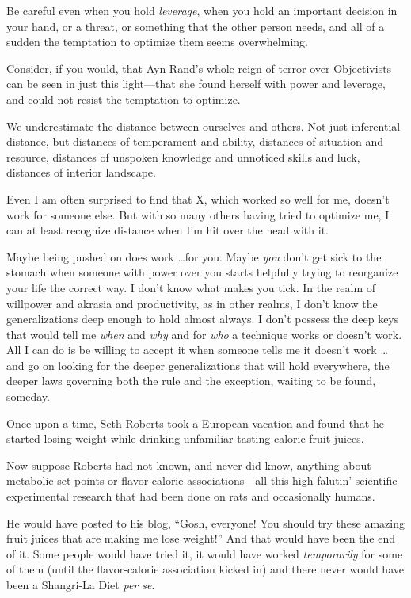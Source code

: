 {
 Be careful even when you hold \textit{leverage}, when you hold an
important decision in your hand, or a threat, or something that the
other person needs, and all of a sudden the temptation to optimize them
seems overwhelming.}

{
 Consider, if you would, that Ayn Rand's whole
reign of terror over Objectivists can be seen in just this light---that
she found herself with power and leverage, and could not resist the
temptation to optimize.}

{
 We underestimate the distance between ourselves and others. Not
just inferential distance, but distances of temperament and ability,
distances of situation and resource, distances of unspoken knowledge
and unnoticed skills and luck, distances of interior landscape.}

{
 Even I am often surprised to find that X, which worked so well for
me, doesn't work for someone else. But with so many
others having tried to optimize me, I can at least recognize distance
when I'm hit over the head with it.}

{
 Maybe being pushed on does work \ldots for you. Maybe \textit{you}
don't get sick to the stomach when someone with power
over you starts helpfully trying to reorganize your life the correct
way. I don't know what makes you tick. In the realm of
willpower and akrasia and productivity, as in other realms, I
don't know the generalizations deep enough to hold
almost always. I don't possess the deep keys that would
tell me \textit{when} and \textit{why} and for \textit{who} a technique
works or doesn't work. All I can do is be willing to
accept it when someone tells me it doesn't work \ldots
and go on looking for the deeper generalizations that will hold
everywhere, the deeper laws governing both the rule and the exception,
waiting to be found, someday.}

\myendsectiontext


{
 Once upon a time, Seth Roberts took a European vacation and found
that he started losing weight while drinking unfamiliar-tasting caloric
fruit juices. }

{
 Now suppose Roberts had not known, and never did know, anything
about metabolic set points or flavor-calorie associations---all this
high-falutin' scientific experimental research that had
been done on rats and occasionally humans.}

{
 He would have posted to his blog, ``Gosh,
everyone! You should try these amazing fruit juices that are making me
lose weight!'' And that would have been the end of
it. Some people would have tried it, it would have worked
\textit{temporarily} for some of them (until the flavor-calorie
association kicked in) and there never would have been a Shangri-La
Diet \textit{per se}.}

